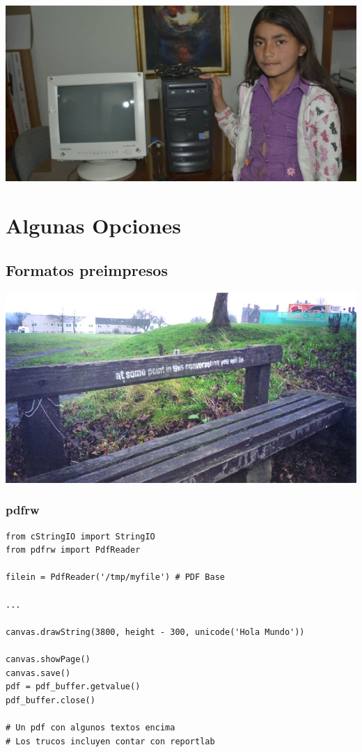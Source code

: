 \documentclass[8pt,xcolor={usenames,dvipsnames}]{beamer}
\begin{document}


\begin{frame}
\includegraphics[width=\paperwidth]{images/kemosion.jpg}

\end{frame}

\section{Algunas Opciones}

\subsection{Formatos preimpresos}

\begin{frame}[fragile]
\includegraphics[width=\paperwidth]{images/graffiti.jpg}

\end{frame}


\begin{frame}[fragile]
\frametitle{pdfrw}
\begin{verbatim}
from cStringIO import StringIO
from pdfrw import PdfReader

filein = PdfReader('/tmp/myfile') # PDF Base

...

canvas.drawString(3800, height - 300, unicode('Hola Mundo'))

canvas.showPage()
canvas.save()
pdf = pdf_buffer.getvalue()
pdf_buffer.close()

# Un pdf con algunos textos encima
# Los trucos incluyen contar con reportlab

\end{verbatim}
\end{frame}
\end{document}
